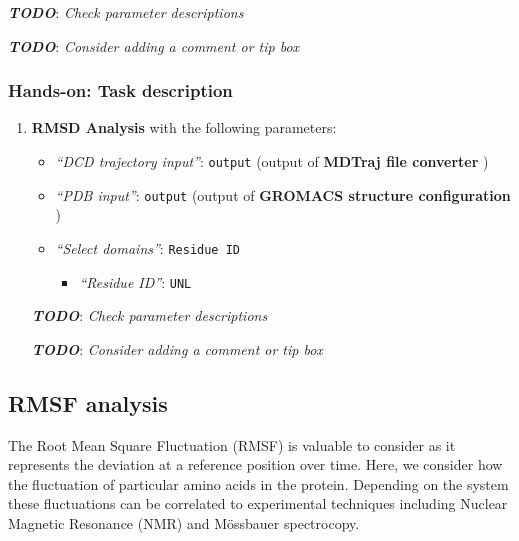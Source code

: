 \documentclass[twocolumn]{bmcart}%
\providecommand{\tightlist}{%
  \setlength{\itemsep}{0pt}\setlength{\parskip}{0pt}}
\providecommand{\tightlist}{%
  \setlength{\itemsep}{0pt}\setlength{\parskip}{0pt}}
\begin{document}
\begin{handson_box_colour}
\begin{enumerate}
  \textbf{\emph{TODO}}: \emph{Check parameter descriptions}

  \textbf{\emph{TODO}}: \emph{Consider adding a comment or tip box}
\end{enumerate}


\hypertarget{hands-on-task-description-11}{%
\subsubsection*{Hands-on: Task
description}\label{hands-on-task-description-11}}

\begin{enumerate}
\def\labelenumi{\arabic{enumi}.}
\tightlist
\item
  \textbf{RMSD Analysis} with the following parameters:

  \begin{itemize}
  \tightlist
  \item
    \emph{``DCD trajectory input''}: \texttt{output} (output of
    \textbf{MDTraj file converter} )
  \item
    \emph{``PDB input''}: \texttt{output} (output of \textbf{GROMACS
    structure configuration} )
  \item
    \emph{``Select domains''}: \texttt{Residue\ ID}

    \begin{itemize}
    \tightlist
    \item
      \emph{``Residue ID''}: \texttt{UNL}
    \end{itemize}
  \end{itemize}

  \textbf{\emph{TODO}}: \emph{Check parameter descriptions}

  \textbf{\emph{TODO}}: \emph{Consider adding a comment or tip box}
\end{enumerate}


\end{handson_box_colour}



\hypertarget{rmsf-analysis}{%
\subsection*{RMSF analysis}\label{rmsf-analysis}}

The Root Mean Square Fluctuation (RMSF) is valuable to consider as it represents the deviation at a reference position over time. Here, we consider how the fluctuation of particular amino acids in the protein. Depending on the system these fluctuations can be correlated to experimental techniques including Nuclear Magnetic Resonance (NMR) and M\"{o}ssbauer spectrocopy.
\end{document}
